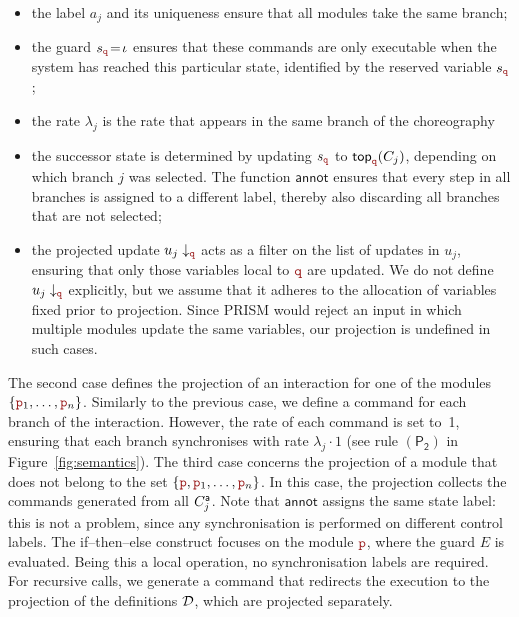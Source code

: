 \begin{itemize}
\item the label $a_j$ and its uniqueness ensure that all modules take
  the same branch;
\item the guard $s_{\role q}\!=\! \iota$ ensures that these commands
  are only executable when the system has reached this particular
  state, identified by the reserved variable $s_{\role q}$;
\item the rate $\lambda_j$ is the rate that appears in the same branch
  of the choreography
\item the successor state is determined by updating $s_{\role q}$ to
  $\topannotation \nrr{C_j}$, depending on which branch $j$ was
  selected. %
  The function $\mathsf{annot}$ ensures that every step in all
  branches is assigned to a different label, thereby also discarding
  all branches that are not selected;
  
\item the projected update $\projE{u_j}{\nrr}$ acts as a filter on the
  list of updates in $u_j$, ensuring that only those variables local
  to $\role q$ are updated. 
  We do not define $\projE{u_j}{\nrr}$ explicitly, but we assume that
  it adheres to the allocation of variables fixed prior to projection.
  Since PRISM would reject an input in which multiple modules update
  the same variables, our projection is undefined in such cases.

\end{itemize}

The second case defines the projection of an interaction for one of
the modules \( \{\role p_1, \ldots, \role p_n\} \). Similarly to the
previous case, we define a command for each branch of the
interaction. However, the rate of each command is set to~1, ensuring
that each branch synchronises with rate \( \lambda_j \cdot 1 \) (see
rule \( \mathsf{(P_2)} \) in Figure~\ref{fig:semantics}).
% 
The third case concerns the projection of a module that does not
belong to the set \( \{\nr, \nr_1,\ldots,\nr_n\} \). In this case, the
projection collects the commands generated from all ${C}^{\mathsf a}_j$. Note
that $\mathsf{annot}$ assigns the same state label: this is not a
problem, since any synchronisation is performed on different control
labels.
%
The if--then--else construct focuses on the module \( \nr \), where
the guard \(E\) is evaluated. Being this a local operation, no
synchronisation labels are required. For recursive calls, we generate
a command that redirects the execution to the projection of the
definitions \(\mathcal D\), which are projected separately. 

